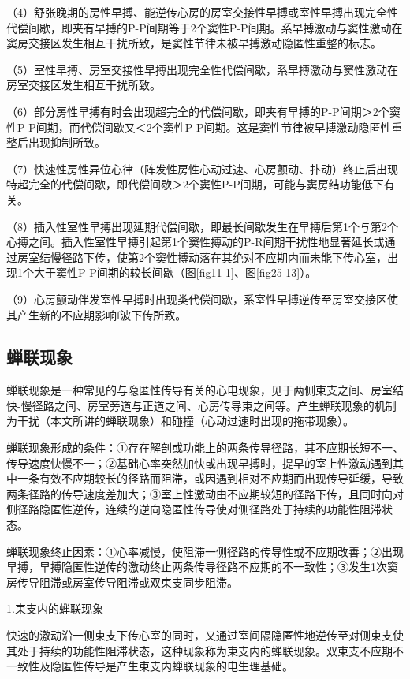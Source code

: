 （4）舒张晚期的房性早搏、能逆传心房的房室交接性早搏或室性早搏出现完全性代偿间歇，即夹有早搏的P-P间期等于2个窦性P-P间期。系早搏激动与窦性激动在窦房交接区发生相互干扰所致，是窦性节律未被早搏激动隐匿性重整的标志。

（5）室性早搏、房室交接性早搏出现完全性代偿间歇，系早搏激动与窦性激动在房室交接区发生相互干扰所致。

（6）部分房性早搏有时会出现超完全的代偿间歇，即夹有早搏的P-P间期＞2个窦性P-P间期，而代偿间歇又＜2个窦性P-P间期。这是窦性节律被早搏激动隐匿性重整后出现抑制所致。

（7）快速性房性异位心律（阵发性房性心动过速、心房颤动、扑动）终止后出现特超完全的代偿间歇，即代偿间歇＞2个窦性P-P间期，可能与窦房结功能低下有关。

（8）插入性室性早搏出现延期代偿间歇，即最长间歇发生在早搏后第1个与第2个心搏之间。插入性室性早搏引起第1个窦性搏动的P-R间期干扰性地显著延长或通过房室结慢径路下传，使第2个窦性搏动落在其绝对不应期内而未能下传心室，出现1个大于窦性P-P间期的较长间歇（图\ref{fig11-1}、图\ref{fig25-13}）。

（9）心房颤动伴发室性早搏时出现类代偿间歇，系室性早搏逆传至房室交接区使其产生新的不应期影响f波下传所致。

\protect\hypertarget{text00042.htmlux5cux23subid457}{}{}

\subsection{蝉联现象}

蝉联现象是一种常见的与隐匿性传导有关的心电现象，见于两侧束支之间、房室结快-慢径路之间、房室旁道与正道之间、心房传导束之间等。产生蝉联现象的机制为干扰（本文所讲的蝉联现象）和碰撞（心动过速时出现的拖带现象）。

蝉联现象形成的条件：①存在解剖或功能上的两条传导径路，其不应期长短不一、传导速度快慢不一；②基础心率突然加快或出现早搏时，提早的室上性激动遇到其中一条有效不应期较长的径路而阻滞，或因遇到相对不应期而出现传导延缓，导致两条径路的传导速度差加大；③室上性激动由不应期较短的径路下传，且同时向对侧径路隐匿性逆传，连续的逆向隐匿性传导使对侧径路处于持续的功能性阻滞状态。

蝉联现象终止因素：①心率减慢，使阻滞一侧径路的传导性或不应期改善；②出现早搏，早搏隐匿性逆传的激动终止两条传导径路不应期的不一致性；③发生1次窦房传导阻滞或房室传导阻滞或双束支同步阻滞。

1.束支内的蝉联现象

快速的激动沿一侧束支下传心室的同时，又通过室间隔隐匿性地逆传至对侧束支使其处于持续的功能性阻滞状态，这种现象称为束支内的蝉联现象。双束支不应期不一致性及隐匿性传导是产生束支内蝉联现象的电生理基础。


